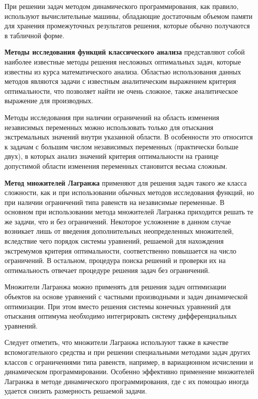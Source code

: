При решении задач методом динамического программирования, как
правило, используют вычислительные машины, обладающие достаточным
объемом памяти для хранения промежуточных результатов решения, которые
обычно получаются в табличной форме.

\textbf{Методы исследования функций классического анализа}
представляют собой наиболее известные методы решения несложных
оптимальных задач, которые известны из курса математического
анализа. Областью использования данных методов являются задачи
с известным аналитическим выражением критерия оптимальности, что
позволяет найти не очень сложное, также аналитическое выражение для
производных.

Методы исследования при наличии ограничений на область изменения
независимых переменных можно использовать только для отыскания
экстремальных значений внутри указанной области. В особенности это
относится к задачам с большим числом независимых переменных
(практически больше двух), в которых анализ значений критерия
оптимальности на границе допустимой области изменения переменных
становится весьма сложным.

\textbf{Метод множителей Лагранжа} применяют для решения задач такого
же класса сложности, как и при использовании обычных методов
исследования функций, но при наличии ограничений типа равенств на
независимые переменные. В основном при использовании метода множителей
Лагранжа приходится решать те же задачи, что и без
ограничений. Некоторое усложнение в данном случае возникает лишь от
введения дополнительных неопределенных множителей, вследствие чего
порядок системы уравнений, решаемой для нахождения экстремумов
критерия оптимальности, соответственно повышается на число
ограничений. В остальном, процедура поиска решений и проверки их на
оптимальность отвечает процедуре решения задач без ограничений.

Множители Лагранжа можно применять для решения задач оптимизации
объектов на основе уравнений с частными производными и задач
динамической оптимизации. При этом вместо решения системы конечных
уравнений для отыскания оптимума необходимо интегрировать систему
дифференциальных уравнений.

Следует отметить, что множители Лагранжа используют также в качестве
вспомогательного средства и при решении специальными методами задач
других классов с ограничениями типа равенств, например, в вариационном
исчислении и динамическом программировании. Особенно эффективно
применение множителей Лагранжа в методе динамического
программирования, где с их помощью иногда удается снизить размерность
решаемой задачи.

